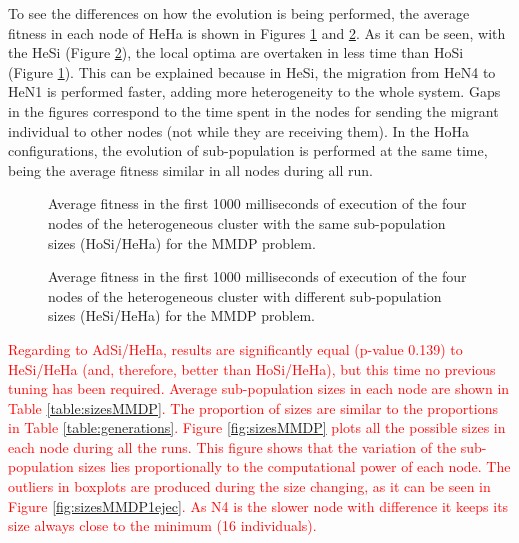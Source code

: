 \documentclass[final,1p,times]{elsarticle}
\begin{document}
To see the differences on how the evolution is being performed, the average fitness in each node of HeHa is shown in Figures \ref{fig:hosiheha} and \ref{fig:hesiheha}. As it can be seen, with the HeSi (Figure \ref{fig:hesiheha}), the local optima are overtaken in less time than HoSi (Figure \ref{fig:hosiheha}).  This can be explained because in HeSi, the migration from HeN4 to HeN1 is performed faster, adding more heterogeneity to the whole system. Gaps in the figures correspond to the time spent in the nodes for sending the migrant individual to other nodes (not while they are receiving them). In the HoHa configurations, the evolution of sub-population is performed at the same time, being the average fitness similar in all nodes during all run. %


\begin{figure}[htb]
\centering
{}
\caption{Average fitness in the first 1000 milliseconds of execution of the four nodes of the heterogeneous cluster with the same sub-population sizes (HoSi/HeHa) for the MMDP problem.}
\label{fig:hosiheha}
\end{figure}

\begin{figure}[htb]
\centering
{} %
\caption{Average fitness in the first 1000 milliseconds of execution of the four nodes of the heterogeneous cluster with different sub-population sizes (HeSi/HeHa) for the MMDP problem.}
\label{fig:hesiheha}
\end{figure}

\textcolor{red}{Regarding to AdSi/HeHa, results are significantly  equal (p-value 0.139) to HeSi/HeHa (and, therefore, better than HoSi/HeHa), but this time no previous tuning has been required.  Average sub-population sizes in each node are shown in Table \ref{table:sizesMMDP}. The proportion of sizes are similar to the proportions in Table \ref{table:generations}. Figure \ref{fig:sizesMMDP} plots all the possible sizes in each node during all the runs. This figure shows that the variation of the sub-population sizes lies proportionally to the computational power of each node. The outliers in boxplots are produced during the size changing, as it can be seen in Figure \ref{fig:sizesMMDP1ejec}. As N4 is the slower node with difference it keeps its size always close to the minimum (16 individuals).}
\end{document}
